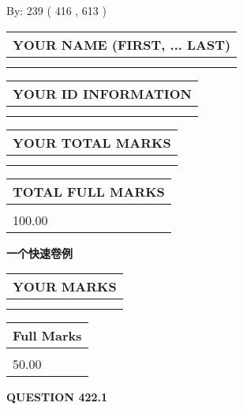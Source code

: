 \documentclass{ctexart}
\begin{document}
   
\hspace{1.0in} By: 
 239 ( 416 ,  613 )
   
   
   
   
\newpage 
\setcounter{page}{ 
   422001 } 
   
   
   
   
\noindent\begin{tabular}{|l|}
\hline
YOUR NAME (FIRST, ... LAST)  \\
\hline
 \\ 
 \\ 
\hline
\end{tabular}
\hspace{0.05in} \begin{tabular}{|l|}
\hline
 YOUR   ID   INFORMATION  \\
\hline
 \\ 
 \\ 
\hline
\end{tabular}
   
   
\vspace{0.2in}\noindent\begin{tabular}{|l|}
\hline
YOUR TOTAL MARKS  \\
\hline
 \\ 
 \\ 
\hline
\end{tabular}
\hspace{0.05in} \begin{tabular}{|l|}
\hline
TOTAL FULL MARKS  \\
\hline
 \\ 
100.00 \\
\hline
\end{tabular}
   
   
 \vspace{0.2in}
{\LARGE {\textbf{ 一个快速卷例}}}
   
   
  
\vspace{0.2in}
  
\noindent\begin{tabular}{|l|}
\hline
 YOUR MARKS  \\
\hline
 \\ 
 \\ 
\hline
\end{tabular}
\hspace{0.05in} \begin{tabular}{|l|}
\hline
 Full Marks  \\
\hline
 \\ 
50.00 \\
\hline
\end{tabular}
{\textbf{\Large{QUESTION
422.1 
}}}
  
\end{document}
